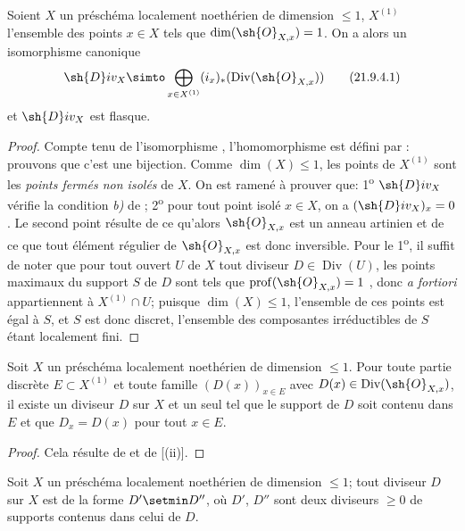\begin{proposition}[21.9.4]
\label{IV.21.9.4}
Soient $X$ un préschéma localement noethérien de dimension $\leq1$, $X^{(1)}$ l'ensemble des points $x\in X$ tels que $\dim(\sh{O}_{X,x})=1$.
On a alors un isomorphisme canonique
\[
\label{IV.21.9.4.1}
  \sh{D}iv_X\simto\bigoplus_{x\in X^{(1)}}(i_x)_*(\operatorname{Div}(\sh{O}_{X,x}))
  \tag{21.9.4.1}
\]
et $\sh{D}iv_X$ est flasque.
\end{proposition}

\begin{proof}
Compte tenu de l'isomorphisme , l'homomorphisme  est défini par :
prouvons que c'est une bijection.
Comme $\dim(X)\leq1$, les points de $X^{(1)}$ sont les \emph{points fermés non isolés} de $X$.
On est ramené à prouver que:
1\textsuperscript{o} $\sh{D}iv_X$ vérifie la condition \emph{b)} de ;
2\textsuperscript{o} pour tout point isolé $x\in X$, on a $(\sh{D}iv_X)_x=0$.
Le second point résulte de ce qu'alors $\sh{O}_{X,x}$ est un anneau artinien et de ce que tout élément régulier de $\sh{O}_{X,x}$ est donc inversible.
Pour le 1\textsuperscript{o}, il suffit de noter que pour tout ouvert $U$ de $X$ tout diviseur $D\in\operatorname{Div}(U)$, les points maximaux du support $S$ de $D$ sont tels que
$\operatorname{prof}(\sh{O}_{X,x})=1$ , donc \emph{a fortiori} appartiennent à $X^{(1)}\cap U$;
puisque $\dim(X)\leq1$, l'ensemble de ces points est égal à $S$, et $S$ est donc discret, l'ensemble des composantes irréductibles de $S$ étant localement fini.
\end{proof}

\begin{corollary}[21.9.5]
\label{IV.21.9.5}
Soit $X$ un préschéma localement noethérien de dimension $\leq1$.
Pour toute partie discrète $E\subset X^{(1)}$ et toute famille $(D(x))_{x\in E}$ avec $D(x)\in\operatorname{Div}(\sh{O}_{X,x})$, il existe un diviseur $D$ sur $X$ et un seul tel que le support de $D$ soit contenu dans $E$ et que $D_x=D(x)$ pour tout $x\in E$.
\end{corollary}

\begin{proof}
Cela résulte de  et de [(ii)].
\end{proof}

\begin{corollary}[21.9.6]
\label{IV.21.9.6}
Soit $X$ un préschéma localement noethérien de dimension $\leq1$;
tout diviseur $D$ sur $X$ est de la forme $D'\setmin D''$, où $D'$, $D''$ sont deux diviseurs $\geq0$ de supports contenus dans celui de $D$.
\end{corollary}

